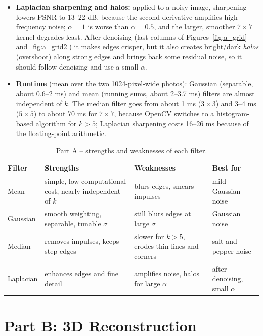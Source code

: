 \documentclass[a4paper,12pt]{article}
\begin{document}
\begin{itemize}
    \item \textbf{Laplacian sharpening and halos:} applied to a noisy image, sharpening lowers PSNR to 13--22 dB, because the second derivative amplifies high-frequency noise; $\alpha=1$ is worse than $\alpha=0.5$, and the larger, smoother $7\times7$ kernel degrades least. After denoising (last columns of Figures~\ref{fig:a_grid} and~\ref{fig:a_grid2}) it makes edges crisper, but it also creates bright/dark \emph{halos} (overshoot) along strong edges and brings back some residual noise, so it should follow denoising and use a small $\alpha$.
    \item \textbf{Runtime} (mean over the two 1024-pixel-wide photos): Gaussian (separable, about 0.6--2 ms) and mean (running sums, about 2--3.7 ms) filters are almost independent of $k$. The median filter goes from about 1 ms ($3\times3$) and 3--4 ms ($5\times5$) to about 70 ms for $7\times7$, because OpenCV switches to a histogram-based algorithm for $k>5$; Laplacian sharpening costs 16--26 ms because of the floating-point arithmetic.
\end{itemize}

\begin{table}[H]
\centering
\caption{Part A -- strengths and weaknesses of each filter.}
\label{tab:a_sw}
\small
\begin{tabularx}{\linewidth}{lXXl}
\toprule
\textbf{Filter} & \textbf{Strengths} & \textbf{Weaknesses} & \textbf{Best for} \\
\midrule
Mean & simple, low computational cost, nearly independent of $k$ & blurs edges, smears impulses & mild Gaussian noise \\
Gaussian & smooth weighting, separable, tunable $\sigma$ & still blurs edges at large $\sigma$ & Gaussian noise \\
Median & removes impulses, keeps step edges & slower for $k>5$, erodes thin lines and corners & salt-and-pepper noise \\
Laplacian & enhances edges and fine detail & amplifies noise, halos for large $\alpha$ & after denoising, small $\alpha$ \\
\bottomrule
\end{tabularx}
\end{table}

\section{Part B: 3D Reconstruction}\label{sec:B}
\end{document}
